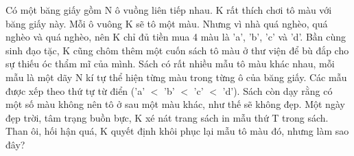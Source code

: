 Có một băng giấy gồm N ô vuồng liên tiếp nhau. K rất thích chơi tô màu với băng giấy này. Mỗi ô vuông K sẽ tô một màu. Nhưng vì nhà quá nghèo, quá nghèo và quá nghèo, nên K chỉ đủ tiền mua 4 màu là 'a', 'b', 'c' và 'd'. Bần cùng sinh đạo tặc, K cũng chôm thêm một cuốn sách tô màu ở thư viện để bù đắp cho sự thiếu óc thẩm mĩ của mình. Sách có rất nhiều mẫu tô màu khác nhau, mỗi mẫu là một dãy N kí tự thể hiện từng màu trong từng ô của băng giấy. Các mẫu được xếp theo thứ tự từ điển ('a' $<$ 'b' $<$ 'c' $<$ 'd'). Sách còn dạy rằng có một số màu không nên tô ở sau một màu khác, như thế sẽ không đẹp. Một ngày đẹp trời, tâm trạng buồn bực, K xé nát trang sách in mẫu thứ T trong sách. Than ôi, hối hận quá, K quyết định khôi phục lại mẫu tô màu đó, nhưng làm sao đây?